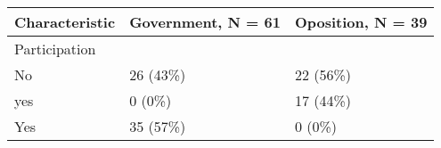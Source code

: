 \documentclass[
]{article}
\begin{document}
\begin{longtable}[]{@{}lll@{}}
\toprule
\begin{minipage}[b]{0.57\columnwidth}\raggedright
\textbf{Characteristic}\strut
\end{minipage} & \begin{minipage}[b]{0.18\columnwidth}\raggedright
\textbf{Government}, N = 61\strut
\end{minipage} & \begin{minipage}[b]{0.17\columnwidth}\raggedright
\textbf{Oposition}, N = 39\strut
\end{minipage}\tabularnewline
\midrule
\endhead
\begin{minipage}[t]{0.57\columnwidth}\raggedright
Participation\strut
\end{minipage} & \begin{minipage}[t]{0.18\columnwidth}\raggedright
\strut
\end{minipage} & \begin{minipage}[t]{0.17\columnwidth}\raggedright
\strut
\end{minipage}\tabularnewline
\begin{minipage}[t]{0.57\columnwidth}\raggedright
No\strut
\end{minipage} & \begin{minipage}[t]{0.18\columnwidth}\raggedright
26 (43\%)\strut
\end{minipage} & \begin{minipage}[t]{0.17\columnwidth}\raggedright
22 (56\%)\strut
\end{minipage}\tabularnewline
\begin{minipage}[t]{0.57\columnwidth}\raggedright
yes\strut
\end{minipage} & \begin{minipage}[t]{0.18\columnwidth}\raggedright
0 (0\%)\strut
\end{minipage} & \begin{minipage}[t]{0.17\columnwidth}\raggedright
17 (44\%)\strut
\end{minipage}\tabularnewline
\begin{minipage}[t]{0.57\columnwidth}\raggedright
Yes\strut
\end{minipage} & \begin{minipage}[t]{0.18\columnwidth}\raggedright
35 (57\%)\strut
\end{minipage} & \begin{minipage}[t]{0.17\columnwidth}\raggedright
0 (0\%)\strut
\end{minipage}\tabularnewline

\end{longtable}
\end{document}
